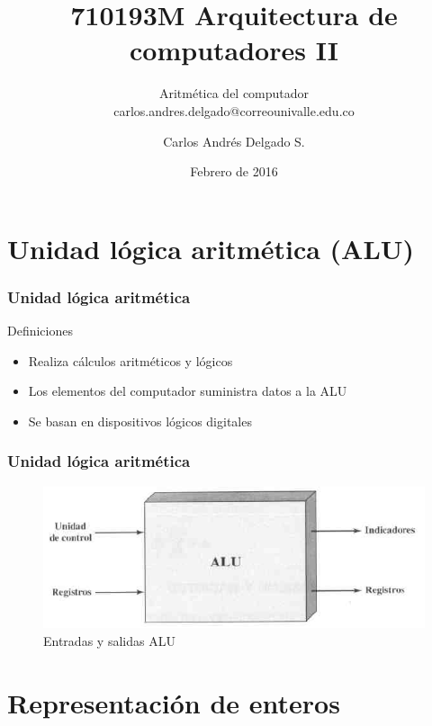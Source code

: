 \documentclass{beamer}
\author{Carlos Andr\'es Delgado S.}
\title{710193M Arquitectura de computadores II}
\subtitle{Aritmética del computador \\ carlos.andres.delgado@correounivalle.edu.co}
\institute{Facultad de Ingeniería. Universidad del Valle}
\date{Febrero de 2016}
\begin{document}
\begin{frame}
	\titlepage	 		
\end{frame}

\begin{frame}
	\tableofcontents	 		
\end{frame}
\section{Unidad lógica aritmética (ALU)}

\begin{frame}
	\frametitle{Unidad lógica aritmética}
	\begin{block}{Definiciones}
		\begin{itemize}
			\item Realiza cálculos aritméticos y lógicos
			\item Los elementos del computador suministra datos a la ALU
			\item Se basan en dispositivos lógicos digitales
		\end{itemize}
	\end{block}	
\end{frame}


\begin{frame}
	\frametitle{Unidad lógica aritmética}
	\begin{figure}[H]
	\centering
	\includegraphics[scale=0.6]{imagenes/ALU.png}
	\caption{Entradas y salidas ALU}
	\end{figure}
	
\end{frame}


\section{Representación de enteros}
\end{document}
